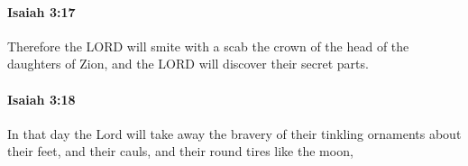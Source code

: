 		\paragraph{Isaiah 3:17} %
			\label{ISAIAH-3-17}

			Therefore the LORD will smite with a scab the crown of the head of the daughters of Zion, and the LORD will discover their secret parts.


		\paragraph{Isaiah 3:18} %
			\label{ISAIAH-3-18}

			In that day the Lord will take away the bravery of their tinkling ornaments about their feet, and their cauls, and their round tires like the moon,



